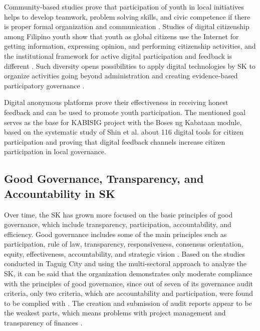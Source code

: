\hspace*{\parindent}Community-based studies prove that participation of youth in local initiatives helps to develop teamwork, problem solving skills, and civic competence if there is proper formal organization and communication \cite{Q,AK,AN}. Studies of digital citizenship among Filipino youth show that youth as global citizens use the Internet for getting information, expressing opinion, and performing citizenship activities, and the institutional framework for active digital participation and feedback is different \cite{AD}. Such diversity opens possibilities to apply digital technologies by SK to organize activities going beyond administration and creating evidence-based participatory governance \cite{G,I,S,T}.
\vspace{5mm}

\hspace*{\parindent}Digital anonymous platforms prove their effectiveness in receiving honest feedback and can be used to promote youth participation. The mentioned goal serves as the base for KABISIG project with the Boses ng Kabataan module, based on the systematic study of Shin et al. \cite{AX} about 116 digital tools for citizen participation and proving that digital feedback channels increase citizen participation in local governance.
\vspace{5mm}

\subsection{Good Governance, Transparency, and Accountability in SK}

\hspace*{\parindent}Over time, the SK has grown more focused on the basic principles of good governance, which include transparency, participation, accountability, and efficiency. Good governance includes some of the main principles such as participation, rule of law, transparency, responsiveness, consensus orientation, equity, effectiveness, accountability, and strategic vision \cite{O}. Based on the studies conducted in Taguig City and using the multi-sectoral approach to analyze the SK, it can be said that the organization demonstrates only moderate compliance with the principles of good governance, since out of seven of its governance audit criteria, only two criteria, which are accountability and participation, were found to be complied with \cite{AR}. The creation and submission of audit reports appear to be the weakest parts, which means problems with project management and transparency of finances \cite{AR}.
\vspace{5mm}

